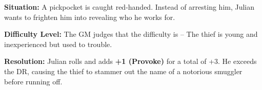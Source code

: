 \begin{WyrdExample}
	\textbf{Situation:} A pickpocket is caught red-handed. Instead of arresting him, Julian wants to frighten him into revealing who he works for.

	\noindent\textbf{Difficulty Level:} The GM judges that the difficulty is \Basic – The thief is young and inexperienced but used to trouble.

	\noindent\textbf{Resolution:} Julian rolls  and adds \textbf{+1 (Provoke)} for a total of +3. He exceeds the DR, causing the thief to stammer out the name of a notorious smuggler before running off.
\end{WyrdExample}


